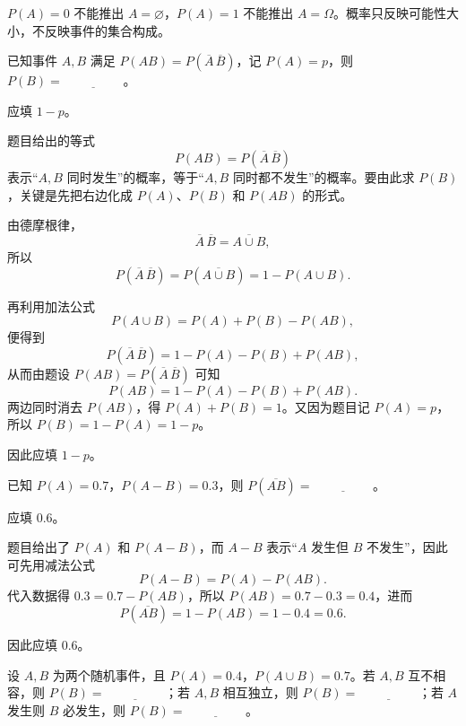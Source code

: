 ﻿\documentclass[lang=cn,11pt]{elegantbook}
\begin{document}
\begin{note}
\(P(A)=0\) 不能推出 \(A=\varnothing\)，\(P(A)=1\) 不能推出 \(A=\Omega\)。概率只反映可能性大小，不反映事件的集合构成。
\end{note}

\begin{exercise}\label{exer:1-32}
已知事件 \(A,B\) 满足 \(P(AB)=P(\overline{A}\,\overline{B})\)，记 \(P(A)=p\)，则 \(P(B)=\underline{\hspace{2cm}}\)。
\end{exercise}

\begin{solution}
应填 \(1-p\)。

题目给出的等式
\[
P(AB)=P(\overline{A}\,\overline{B})
\]
表示“\(A,B\) 同时发生”的概率，等于“\(A,B\) 同时都不发生”的概率。要由此求 \(P(B)\)，关键是先把右边化成 \(P(A)\)、\(P(B)\) 和 \(P(AB)\) 的形式。

由德摩根律，
\[
\overline{A}\,\overline{B}=\overline{A\cup B},
\]
所以
\[
P(\overline{A}\,\overline{B})=P(\overline{A\cup B})=1-P(A\cup B).
\]

再利用加法公式
\[
P(A\cup B)=P(A)+P(B)-P(AB),
\]
便得到
\[
P(\overline{A}\,\overline{B})=1-P(A)-P(B)+P(AB),
\]
从而由题设 \(P(AB)=P(\overline{A}\,\overline{B})\) 可知
\[
P(AB)=1-P(A)-P(B)+P(AB).
\]
两边同时消去 \(P(AB)\)，得 \(P(A)+P(B)=1\)。又因为题目记 \(P(A)=p\)，所以 \(P(B)=1-P(A)=1-p\)。

因此应填 \(1-p\)。
\end{solution}

\begin{exercise}\label{exer:1-33}
已知 \(P(A)=0.7\)，\(P(A-B)=0.3\)，则 \(P(\overline{AB})=\underline{\hspace{2cm}}\)。
\end{exercise}

\begin{solution}
应填 \(0.6\)。

题目给出了 \(P(A)\) 和 \(P(A-B)\)，而 \(A-B\) 表示“\(A\) 发生但 \(B\) 不发生”，因此可先用减法公式
\[
P(A-B)=P(A)-P(AB).
\]
代入数据得 \(0.3=0.7-P(AB)\)，所以 \(P(AB)=0.7-0.3=0.4\)，进而
\[
P(\overline{AB})=1-P(AB)=1-0.4=0.6.
\]

因此应填 \(0.6\)。
\end{solution}

\begin{exercise}\label{exer:1-34}
设 \(A,B\) 为两个随机事件，且 \(P(A)=0.4\)，\(P(A\cup B)=0.7\)。若 \(A,B\) 互不相容，则 \(P(B)=\underline{\hspace{2cm}}\)；若 \(A,B\) 相互独立，则 \(P(B)=\underline{\hspace{2cm}}\)；若 \(A\) 发生则 \(B\) 必发生，则 \(P(B)=\underline{\hspace{2cm}}\)。
\end{exercise}
\end{document}
